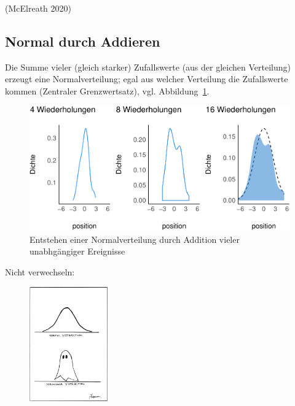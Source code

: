 \documentclass[
  a4paper,
  DIV=11]{scrreprt}
\theoremstyle{definition}
\theoremstyle{remark}
\begin{document}
(McElreath 2020)

\hypertarget{normal-durch-addieren}{%
\subsection{Normal durch Addieren}\label{normal-durch-addieren}}

Die Summe vieler (gleich starker) Zufallswerte (aus der gleichen
Verteilung) erzeugt eine Normalverteilung; egal aus welcher Verteilung
die Zufallswerte kommen (Zentraler Grenzwertsatz), vgl.
Abbildung~\ref{fig-fussball}.

\begin{figure}

{\centering \includegraphics[width=1\textwidth,height=\textheight]{./Verteilungen_files/figure-pdf/fig-fussball-1.pdf}

}

\caption{\label{fig-fussball}Entstehen einer Normalverteilung durch
Addition vieler unabhgängiger Ereignisse}

\end{figure}

Nicht verwechseln:

\begin{figure}

{\centering \includegraphics[width=0.3\textwidth,height=\textheight]{./img/ch33910f1.jpg}

}

\end{figure}
\end{document}
